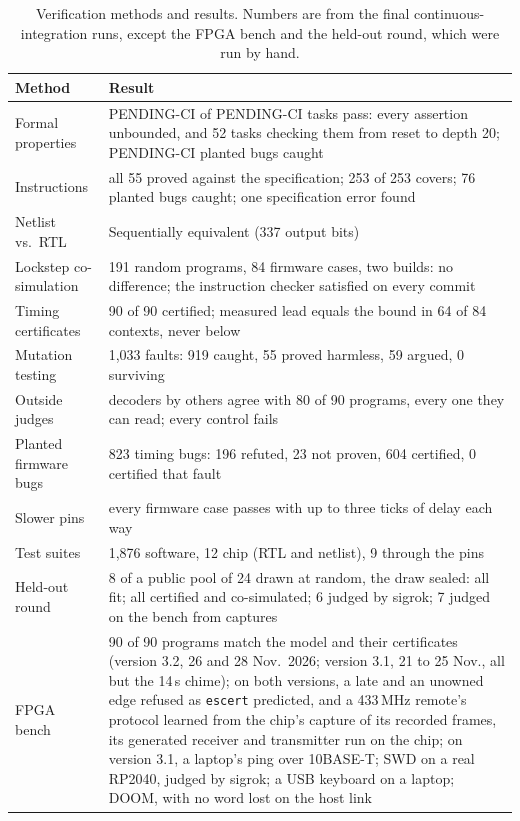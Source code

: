 \documentclass[conference,letterpaper]{IEEEtran}
\begin{document}
\begin{table}[t]
\centering
\caption{Verification methods and results. Numbers are from the final
continuous-integration runs, except the FPGA bench and the held-out round, which were run
by hand.}
\label{tab:verif}
\footnotesize
\begin{tabular}{@{}p{}p{}@{}}
\toprule
Method & Result \\
\midrule
Formal properties & PENDING-CI of PENDING-CI tasks pass: every assertion unbounded, and 52 tasks checking them from reset to depth 20; PENDING-CI planted bugs caught \\
Instructions & all 55 proved against the specification; 253 of 253 covers; 76 planted bugs caught; one specification error found \\
Netlist vs.\ RTL & Sequentially equivalent (337 output bits) \\
Lockstep co-simulation & 191 random programs, 84 firmware cases, two builds: no difference; the instruction checker satisfied on every commit \\
Timing certificates & 90 of 90 certified; measured lead equals the bound in 64 of 84 contexts, never below \\
Mutation testing & 1,033 faults: 919 caught, 55 proved harmless, 59 argued, 0 surviving \\
Outside judges & decoders by others agree with 80 of 90 programs, every one they can read; every control fails \\
Planted firmware bugs & 823 timing bugs: 196 refuted, 23 not proven, 604 certified, 0 certified that fault \\
Slower pins & every firmware case passes with up to three ticks of delay each way \\
Test suites & 1,876 software, 12 chip (RTL and netlist), 9 through the pins \\
Held-out round & 8 of a public pool of 24 drawn at random, the draw sealed: all fit; all certified and co-simulated; 6 judged by sigrok; 7 judged on the bench from captures \\
FPGA bench & 90 of 90 programs match the model and their certificates (version 3.2, 26 and 28 Nov.\ 2026; version 3.1, 21 to 25 Nov., all but the 14\,s chime); on both versions, a late and an unowned edge refused as \texttt{escert} predicted, and a 433\,MHz remote's protocol learned from the chip's capture of its recorded frames, its generated receiver and transmitter run on the chip; on version 3.1, a laptop's ping over 10BASE-T; SWD on a real RP2040, judged by sigrok; a USB keyboard on a laptop; DOOM, with no word lost on the host link \\
\bottomrule
\end{tabular}
\end{table}
\end{document}
